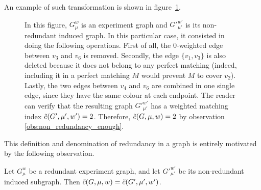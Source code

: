 An example of such transformation is shown in figure~\ref{fig:non_redundant_induced_graph}.

\begin{figure}[H]
    \caption{In this figure, $G_\mu^w$ is an experiment graph and ${G'}_{\mu'}^{w'}$ is its non-redundant induced graph. In this particular case, it consisted in doing the following operations. First of all, the $0$-weighted edge between $v_3$ and $v_6$ is removed. Secondly, the edge $\{v_1, v_3\}$ is also deleted because it does not belong to any perfect matching (indeed, including it in a perfect matching $M$ would prevent $M$ to cover $v_2$). Lastly, the two edges between $v_4$ and $v_6$ are combined in one single edge, since they have the same colour at each endpoint. The reader can verify that the resulting graph ${G'}_{\mu'}^{w'}$ has a weighted matching index $\Tilde{c}(G', \mu', w') = 2$. Therefore, $\Tilde{c}(G, \mu, w) = 2$ by observation \ref{obs:non_redundancy_enough}.}
    \label{fig:non_redundant_induced_graph}
\end{figure}

This definition and denomination of redundancy in a graph is entirely motivated by the following observation.

\begin{observation}
    \label{obs:non_redundancy_enough}
    Let $G_\mu^w$ be a redundant experiment graph, and let ${G'}_{\mu'}^{w'}$ be its non-redundant induced subgraph.
    Then $\Tilde{c}(G, \mu, w) = \Tilde{c}(G', \mu', w')$.
\end{observation}

